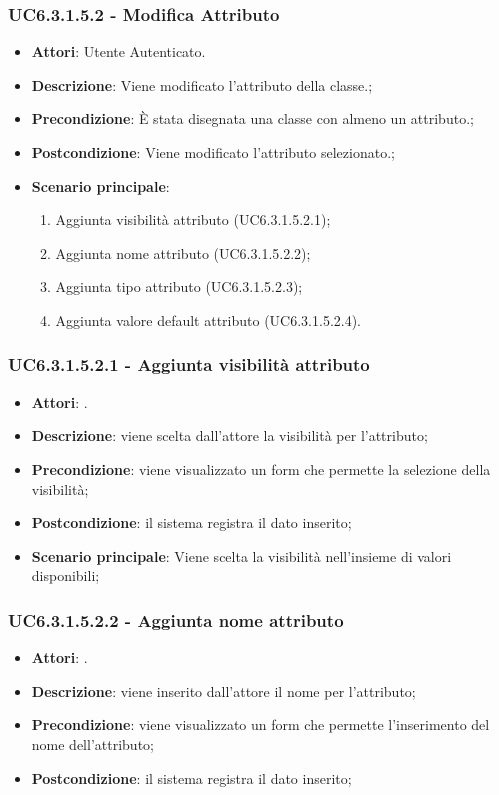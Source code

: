 \subsubsection{UC6.3.1.5.2 - Modifica Attributo} 
\label{sssec:UC6.3.1.5.2} 
\begin{itemize} 
\item \textbf{Attori}: Utente Autenticato.
\item \textbf{Descrizione}: Viene modificato l'attributo della classe.;
\item \textbf{Precondizione}: È stata disegnata una classe con almeno un attributo.;
\item \textbf{Postcondizione}: Viene modificato l'attributo selezionato.;
\item \textbf{Scenario principale}: \begin{enumerate}\item Aggiunta visibilità attributo (UC6.3.1.5.2.1);\item Aggiunta nome attributo (UC6.3.1.5.2.2);\item Aggiunta tipo attributo (UC6.3.1.5.2.3);\item Aggiunta valore default attributo (UC6.3.1.5.2.4). 
 \end{enumerate}
\end{itemize} 
\subsubsection{UC6.3.1.5.2.1 - Aggiunta visibilità attributo} 
\label{sssec:UC6.3.1.5.2.1} 
\begin{itemize} 
\item \textbf{Attori}: .
\item \textbf{Descrizione}: viene scelta dall'attore la visibilità per l'attributo;
\item \textbf{Precondizione}: viene visualizzato un form che permette la selezione della visibilità;
\item \textbf{Postcondizione}: il sistema registra il dato inserito;
\item \textbf{Scenario principale}: Viene scelta la visibilità nell'insieme di valori disponibili;\end{itemize} 
\subsubsection{UC6.3.1.5.2.2 - Aggiunta nome attributo} 
\label{sssec:UC6.3.1.5.2.2} 
\begin{itemize} 
\item \textbf{Attori}: .
\item \textbf{Descrizione}: viene inserito dall'attore il nome per l'attributo;
\item \textbf{Precondizione}: viene visualizzato un form che permette l'inserimento del nome dell'attributo;
\item \textbf{Postcondizione}: il sistema registra il dato inserito;
\end{itemize} 
